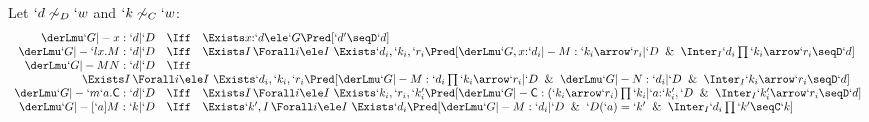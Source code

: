 \documentclass{CSML}
\begin{document}
\def\derLmuInt{\derLmu}

 \begin{lem} \label{mu gen Lemma} \label{gen lemma}
Let $`d \not\sim_D `w$ and $`k \not\sim_C`w$:
%
 \[ \begin{array}{rcl}
\derLmuInt `G |- x : `d | `D &\Iff& \Exists x{:}`d \ele `G \Pred[ `d' \seqD `d ]
	\\
\derLmuInt `G |- `lx.M : `d | `D &\Iff& 
\Exists I \, \Forall i \ele I ~ \Exists `d_i,`k_i,`r_i \Pred[ \derLmuInt `G, x{:}`d_i |- M : `k_i\arrow `r_i | `D \And \Inter_I `d_i\prod `k_i\arrow `r_i \seqD `d ] 
	\\
\derLmuInt `G |- MN : `d | `D &\Iff& 
\\ \multicolumn{3}{r} {
\Exists I \, \Forall i \ele I ~ \Exists `d_i,`k_i,`r_i \Pred[ \derLmuInt `G |- M : `d_i\prod `k_i\arrow `r_i | `D \And \derLmuInt `G |- N : `d_i | `D \And \Inter_I`k_i\arrow `r_i \seqD `d ] 
}
\quad
	\\
\derLmuInt `G |- `m`a.{\Cmd} : `d | `D &\Iff& 
\Exists I \, \Forall i \ele I ~ \Exists `k_i,`r_i, `k'_i \Pred[ \derLmuInt `G |- {\Cmd} : (`k_i\arrow `r_i)\prod `k_i | `a{:}`k'_i, `D \And \Inter_I`k'_i\arrow `r_i \seqD `d ] 
	\\
\derLmuInt `G |- [`a]M : `k | `D &\Iff& 
\Exists `k',I \, \Forall i \ele I ~ \Exists `d_i \Pred[ \derLmuInt `G |- M : `d_i | `D \And `D(`a) = `k'  \And \Inter_I `d_i\prod `k' \seqC `k ] 
 \end{array} \]
 \end{lem}
\end{document}
